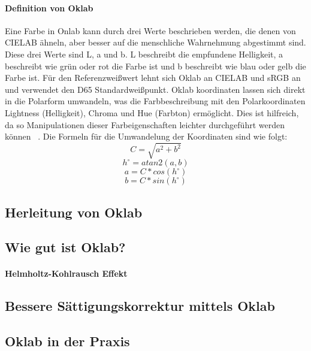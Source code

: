 \documentclass[12pt, a4paper, ngerman]{article}
\begin{document}
\paragraph{Definition von Oklab}
Eine Farbe in Onlab kann durch drei Werte beschrieben werden, die denen von CIELAB ähneln, 
aber besser auf die menschliche Wahrnehmung abgestimmt sind.
Diese drei Werte sind L, a und b. 
L beschreibt die empfundene Helligkeit, a beschreibt wie grün oder rot die Farbe ist und b beschreibt wie blau oder gelb die Farbe ist.
Für den Referenzweißwert lehnt sich Oklab an CIELAB und sRGB an und verwendet den D65 Standardweißpunkt.
Oklab koordinaten lassen sich direkt in die Polarform umwandeln, 
was die Farbbeschreibung mit den Polarkoordinaten Lightness (Helligkeit), Chroma und Hue (Farbton) ermöglicht.
Dies ist hilfreich, da so Manipulationen dieser Farbeigenschaften leichter durchgeführt werden können ~\cite{Oklab_2020}.
Die Formeln für die Umwandelung der Koordinaten sind wie folgt:
\[C=\sqrt{ a^2 + b^2 }\]
\[h^\circ = atan2\left( a, b \right)\]
\[a = C*cos\left( h^\circ \right)\]
\[b = C*sin\left( h^\circ \right)\]

\subsection{Herleitung von Oklab}
\subsection{Wie gut ist Oklab?}
\paragraph{Helmholtz-Kohlrausch Effekt}
\subsection{Bessere Sättigungskorrektur mittels Oklab}
\subsection{Oklab in der Praxis}

\newpage
\printbibliography
\end{document}
